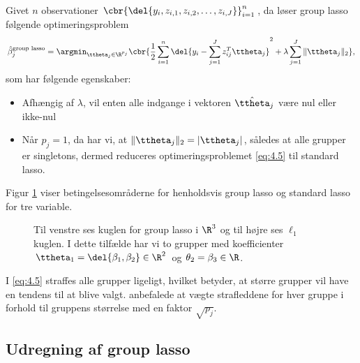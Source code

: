 Givet \(n\) observationer \(\cbr{ \del{y_i, z_{i,1}, z_{i,2}, \ldots, z_{i,J}}}_{i=1}^n\), da løser group lasso følgende optimeringsproblem
\begin{align}
\hat{\beta}_j^{\text{group lasso}} = \argmin_{\ttheta_j \in \R^{p_j}} \cbr{\frac{1}{2} \sum_{i=1}^n \del{y_i - \sum_{j=1}^J z_{ij}^T \ttheta_j}^2 + \lambda \sum_{j=1}^J \Vert \ttheta_j \Vert_2}, \label{eq:4.5}
\end{align}
som har følgende egenskaber:
\begin{itemize}
\item Afhængig af $\lambda$, vil enten alle indgange i vektoren $\hat{\ttheta}_j$ være nul eller ikke-nul
\item Når $p_j=1$, da har vi, at $\Vert \ttheta_j \Vert_2 = \vert \ttheta_j \vert$, således at alle grupper er singletons, dermed reduceres optimeringsproblemet \eqref{eq:4.5} til standard lasso.
\end{itemize}
Figur \ref{fig:group_lasso} viser betingelsesområderne for henholdsvis group lasso og standard lasso for tre variable.
%
\begin{figure}[H]
\centering
\caption{Til venstre ses kuglen for group lasso i \(\R^3\) og til højre ses \(\ell_1\) kuglen.
I dette tilfælde har vi to grupper med koefficienter \(\ttheta_1 = \del{\beta_1, \beta_2} \in \R^2\) og \(\theta_2 = \beta_3 \in \R\).}
\label{fig:group_lasso}
\end{figure}
%
I \eqref{eq:4.5} straffes alle grupper ligeligt, hvilket betyder, at større grupper vil have en tendens til at blive valgt.
\citep{group_lasso} anbefalede at vægte strafleddene for hver gruppe i forhold til gruppens størrelse med en faktor \(\sqrt{p_j}\).

\subsection{Udregning af group lasso}

